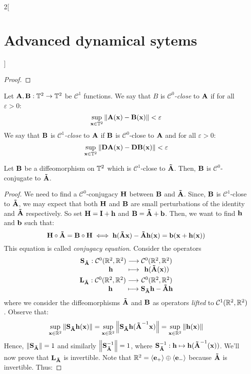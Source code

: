 \documentclass[../../../main_math.tex]{subfiles}
\begin{document}
\begin{multicols}{2}[\section{Advanced dynamical sytems}]
\begin{proof}
  \end{proof}
  \begin{definition}
    Let $\vf{A},\vf{B}:\TT^2\rightarrow \TT^2$ be $\mathcal{C}^1$ functions. We say that $B$ is \emph{$\mathcal{C}^0$-close} to $\vf{A}$ if for all $\varepsilon>0$:
    $$
      \sup_{\vf{x}\in \TT^2}\norm{\vf{A}(\vf{x})-\vf{B}(\vf{x})}<\varepsilon
    $$
    We say that $\vf{B}$ is \emph{$\mathcal{C}^1$-close} to $\vf{A}$ if $\vf{B}$ is $\mathcal{C}^0$-close to $\vf{A}$ and for all $\varepsilon>0$:
    $$
      \sup_{\vf{x}\in \TT^2}\norm{\vf{D}\vf{A}(\vf{x})-\vf{D}\vf{B}(\vf{x})}<\varepsilon
    $$
  \end{definition}
  \begin{theorem}
    Let $\vf{B}$ be a diffeomorphism on $\TT^2$ which is $\mathcal{C}^1$-close to $\vf{\tilde{A}}$. Then, $\vf{B}$ is $\mathcal{C}^0$-conjugate to $\vf{\tilde{A}}$.
  \end{theorem}
  \begin{proof}
    We need to find a $\mathcal{C}^0$-conjugacy $\vf{H}$ between $\vf{B}$ and $\vf{\tilde{A}}$. Since, $\vf{B}$ is $\mathcal{C}^1$-close to $\vf{\tilde{A}}$, we may expect that both $\vf{H}$ and $\vf{B}$ are small perturbations of the identity and $\vf{\tilde{A}}$ respectively. So set $\vf{H}=\vf{I}+\vf{h}$ and $\vf{B}=\vf{\tilde{A}}+\vf{b}$. Then, we want to find $\vf{h}$ and $\vf{b}$ such that:
    $$
      \vf{H}\circ \vf{\tilde{A}}=\vf{B}\circ \vf{H}\iff
      \vf{h}(\vf{\tilde{A}x})-\vf{\tilde{A}} \vf{h}(\vf{x})=\vf{b}(\vf{x}+\vf{h}(\vf{x}))
    $$
    This equation is called \emph{conjugacy equation}. Consider the operators
    \begin{gather*}
      \function{\vf{S}_{\vf{\tilde{A}}}}{\mathcal{C}^0(\RR^2,\RR^2)}{\mathcal{C}^0(\RR^2,\RR^2)}{\vf{h}}{\vf{h}(\vf{\tilde{A}}(\vf{x}))}\\
      \function{\vf{L}_{\vf{\tilde{A}}}}{\mathcal{C}^0(\RR^2,\RR^2)}{\mathcal{C}^0(\RR^2,\RR^2)}{\vf{h}}{\vf{S}_{\vf{\tilde{A}}}\vf{h}-\vf{\tilde{A}}\vf{h}}
    \end{gather*}
    where we consider the diffeomorphisms $\vf{\tilde{A}}$ and $\vf{B}$ as operators \textit{lifted} to $\mathcal{C}^1(\RR^2,\RR^2)$. Observe that:
    $$
      \sup_{\vf{x}\in \RR^2}\norm{\vf{S}_{\vf{\tilde{A}}}\vf{h}(\vf{x})}=\sup_{\vf{x}\in \RR^2}\norm{\vf{S}_{\vf{\tilde{A}}}\vf{h}(\vf{\tilde{A}}^{-1}\vf{x})}= \sup_{\vf{x}\in \RR^2}\norm{\vf{h}(\vf{x})}
    $$
    Hence, $\norm{\vf{S}_{\vf{\tilde{A}}}}=1$ and similarly $\norm{\vf{S}_{\vf{\tilde{A}}}^{-1}}=1$, where $\vf{S}_{\vf{\tilde{A}}}^{-1}:\vf{h}\mapsto \vf{h}(\vf{\tilde{A}}^{-1}(\vf{x}))$. We'll now prove that $\vf{L}_{\vf{\tilde{A}}}$ is invertible. Note that $\RR^2=\langle \vf{e}_+\rangle \oplus \langle \vf{e}_-\rangle$ because $\vf{\tilde{A}}$ is invertible. Thus:

\end{proof}
\end{multicols}
\end{document}
